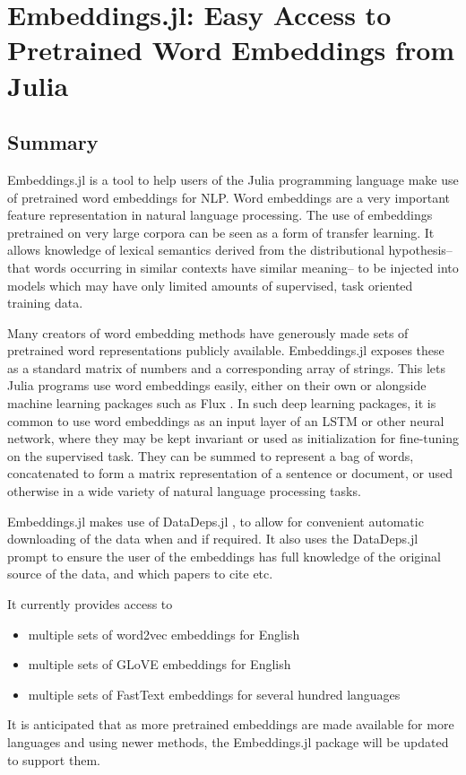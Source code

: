 \documentclass{book}
\begin{document}
\chapter{Embeddings.jl: Easy Access to Pretrained Word Embeddings from Julia}

\hypertarget{summary}{%
\section{Summary}}

Embeddings.jl is a tool to help users of the Julia programming language
\citep{Julia} make use of pretrained word embeddings for NLP. Word
embeddings are a very important feature representation in natural
language processing. The use of embeddings pretrained on very large
corpora can be seen as a form of transfer learning. It allows knowledge
of lexical semantics derived from the distributional hypothesis-- that
words occurring in similar contexts have similar meaning-- to be
injected into models which may have only limited amounts of supervised,
task oriented training data.

Many creators of word embedding methods have generously made sets of
pretrained word representations publicly available. Embeddings.jl
exposes these as a standard matrix of numbers and a corresponding array
of strings. This lets Julia programs use word embeddings easily, either
on their own or alongside machine learning packages such as Flux
\citep{flux}. In such deep learning packages, it is common to use word
embeddings as an input layer of an LSTM or other neural network, where
they may be kept invariant or used as initialization for fine-tuning on
the supervised task. They can be summed to represent a bag of words,
concatenated to form a matrix representation of a sentence or document,
or used otherwise in a wide variety of natural language processing
tasks.

Embeddings.jl makes use of DataDeps.jl \citep{2018arXiv180801091W}, to allow for
convenient automatic downloading of the data when and if required. It
also uses the DataDeps.jl prompt to ensure the user of the embeddings
has full knowledge of the original source of the data, and which papers
to cite etc.

It currently provides access to

\begin{itemize}
	\item
	multiple sets of word2vec embeddings \citep{mikolov2013efficient} for English
	\item
	multiple sets of GLoVE \citep{pennington2014glove} embeddings for English
	\item
	multiple sets of FastText embeddings \citep{bojanowski2016enriching,fasttext157lang}
	for several hundred languages
\end{itemize}

It is anticipated that as more pretrained embeddings are made available
for more languages and using newer methods, the Embeddings.jl package
will be updated to support them.
\end{document}
